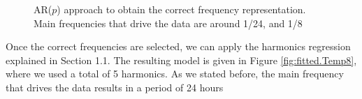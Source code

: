 \documentclass[]{article}
\begin{document}
\begin{figure}[htbp]
	\centering
	\hfill
	\caption{AR($p$) approach to obtain the correct frequency representation. Main frequencies that drive the data are around 1/24, and 1/8}
	\label{fig:spectrums_Temp8}
\end{figure}

Once the correct frequencies are selected, we can apply the harmonics regression explained in Section 1.1. The resulting model is given in Figure \ref{fig:fitted.Temp8}, where we used a total of 5 harmonics. As we stated before, the main frequency that drives the data results in a period of 24 hours
\end{document}

